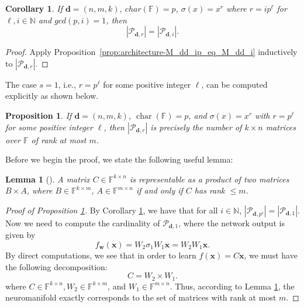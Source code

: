 \documentclass[a4paper]{cas-sc}
\newcommand{\xx}{\textbf{x}}    %
\newcommand{\ww}{\mathbf{w}}    %
\newcommand{\dd}{\mathbf{d}}    %
\newcommand{\F}{\mathbb{F}}
\newtheorem{corollary}{Corollary}[theorem]
\newtheorem{lemma}[theorem]{Lemma}
\newtheorem{proposition}[theorem]{Proposition}
\begin{document}
\begin{corollary}
\label{cor: architecture - get rid of ps in r prime decomposition}
    If $\dd=(n,m,k),\ char(\F) = p$, $\sigma(x) = x^r$ where $r = ip^\ell$ for $\ell,i\in\mathbb{N}$ and $gcd(p,i)= 1$, then 
    \[
        |{\mathcal{P}}_{\dd,r}|=|{\mathcal{P}}_{\dd,i}|.
    \]
\end{corollary}
\begin{proof}
    Apply Proposition~\ref{prop:architecture-M_dd_ip_eq_M_dd_i} inductively to $|{\mathcal{P}}_{\dd,r}|$.
\end{proof}
The case $s=1$, i.e., $r = p^\ell$ for some positive integer $\ell$, can be computed explicitly as shown below.
\begin{proposition}\label{prop: r = p^i}
    If $\dd = (n,m,k)$, $\operatorname{char}(\F) = p$, and $\sigma(x) = x^r$ with $r = p^\ell$ for some positive integer $\ell$, then $|\mathcal{P}_{\dd,r}|$ is precisely the number of $k \times n$ matrices over $\F$ of rank at most $m$.
\end{proposition} 

Before we begin the proof, we state the following useful lemma:
\begin{lemma}[{\citet[Theorem~3.56]{AXLER15}}] \label{lem: matrix decomposition rank <= m}
    A matrix $C \in \F^{k \times n}$ is representable as a product of two matrices $B \times A$, where $B \in \F^{k \times m}$, $A \in \F^{m \times n}$ if and only if $C$ has rank $\leq m$.
\end{lemma}

\begin{proof}[Proof of Proposition \ref{prop: r = p^i}]

By Corollary \ref{cor: architecture - get rid of ps in r prime decomposition}, we have that for all $i \in \mathbb{N}$, $|{\mathcal{P}}_{\dd,p^i}| = |{\mathcal{P}}_{\dd,1}|$. Now we need to compute the cardinality of $\mathcal{P}_{\dd,1}$, where the network output is given by 
\[
    f_{\ww}(\xx)=W_2\sigma_1 W_1\xx = W_2W_1\xx. 
\]
By direct computations, we see that in order to learn $f(\xx)=C\xx$, we must have the following decomposition: 
\[
    C = W_2\times W_1.
\]
where $C \in \F^{k \times n}, W_2 \in \F^{k \times m}$, and $W_1 \in \F^{m \times n}$. Thus, according to Lemma \ref{lem: matrix decomposition rank <= m}, the neuromanifold exactly corresponds to the set of matrices with rank at most $m$. 
\end{proof}
\end{document}
